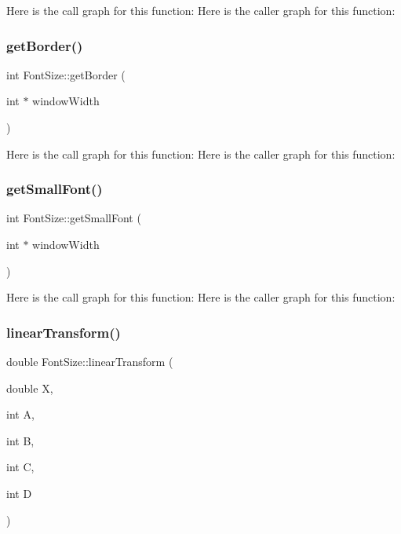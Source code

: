 Here is the call graph for this function\+:
Here is the caller graph for this function\+:
\mbox{\label{class_font_size_a341e329a4ab9d0688d95b117398d324d}} 
\subsubsection{\texorpdfstring{get\+Border()}{getBorder()}}
{\footnotesize\ttfamily int Font\+Size\+::get\+Border (\begin{DoxyParamCaption}\item[{int $\ast$}]{window\+Width }\end{DoxyParamCaption})\hspace{0.3cm}{\ttfamily [static]}}

Here is the call graph for this function\+:
Here is the caller graph for this function\+:
\mbox{\label{class_font_size_ac20daf65517d4a6f0892cb6c46b30739}} 
\subsubsection{\texorpdfstring{get\+Small\+Font()}{getSmallFont()}}
{\footnotesize\ttfamily int Font\+Size\+::get\+Small\+Font (\begin{DoxyParamCaption}\item[{int $\ast$}]{window\+Width }\end{DoxyParamCaption})\hspace{0.3cm}{\ttfamily [static]}}

Here is the call graph for this function\+:
Here is the caller graph for this function\+:
\mbox{\label{class_font_size_ada2f9f5c9056fcdc738df0187895d1f2}} 
\subsubsection{\texorpdfstring{linear\+Transform()}{linearTransform()}}
{\footnotesize\ttfamily double Font\+Size\+::linear\+Transform (\begin{DoxyParamCaption}\item[{double}]{X,  }\item[{int}]{A,  }\item[{int}]{B,  }\item[{int}]{C,  }\item[{int}]{D }\end{DoxyParamCaption})\hspace{0.3cm}{\ttfamily [static]}}



